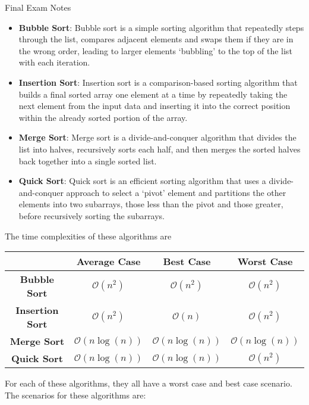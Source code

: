 \begin{examnotes}{Final Exam Notes}
    \begin{itemize}
        \item \textbf{Bubble Sort}: Bubble sort is a simple sorting algorithm that repeatedly steps through the list, compares adjacent elements and swaps them if they are in the wrong order, leading 
        to larger elements `bubbling' to the top of the list with each iteration.
        \item \textbf{Insertion Sort}: Insertion sort is a comparison-based sorting algorithm that builds a final sorted array one element at a time by repeatedly taking the next element from the input 
        data and inserting it into the correct position within the already sorted portion of the array.
        \item \textbf{Merge Sort}: Merge sort is a divide-and-conquer algorithm that divides the list into halves, recursively sorts each half, and then merges the sorted halves back together into a 
        single sorted list.
        \item \textbf{Quick Sort}: Quick sort is an efficient sorting algorithm that uses a divide-and-conquer approach to select a `pivot' element and partitions the other elements into two subarrays, 
        those less than the pivot and those greater, before recursively sorting the subarrays.
    \end{itemize}
    The time complexities of these algorithms are
    \begin{center}
        \begin{tabular}[ht]{|c|c|c|c|}
            \hline & \textbf{Average Case} & \textbf{Best Case} & \textbf{Worst Case} \\ \hline
            \textbf{Bubble Sort} & $\mathcal{O}(n^{2})$ & $\mathcal{O}(n^{2})$ & $\mathcal{O}(n^{2})$ \\ \hline
            \textbf{Insertion Sort} & $\mathcal{O}(n^{2})$ & $\mathcal{O}(n)$ & $\mathcal{O}(n^{2})$ \\ \hline
            \textbf{Merge Sort} & $\mathcal{O}(n\log{(n)})$ & $\mathcal{O}(n\log{(n)})$ & $\mathcal{O}(n\log{(n)})$ \\ \hline
            \textbf{Quick Sort} & $\mathcal{O}(n\log{(n)})$ & $\mathcal{O}(n\log{(n)})$ & $\mathcal{O}(n^{2})$ \\ \hline
        \end{tabular}
    \end{center}

    For each of these algorithms, they all have a worst case and best case scenario. The scenarios for these algorithms are:


\end{examnotes}
